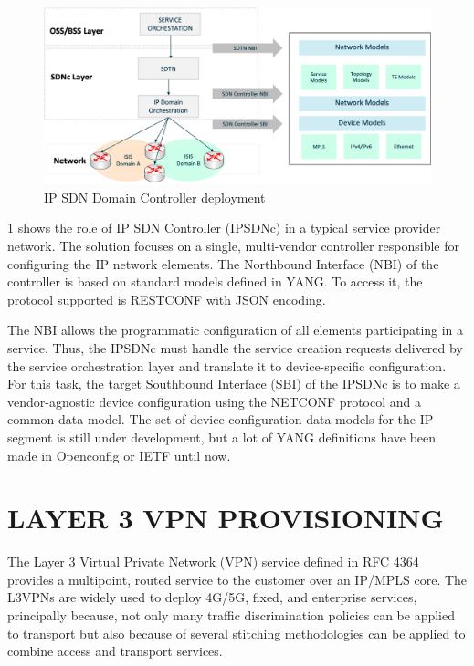 \documentclass[conference]{IEEEtran}
\begin{document}
\begin{figure}
	\centering
		\includegraphics[width=\linewidth]{ifusion_multidomain_2.png}
	\caption{IP SDN Domain Controller deployment}
	\label{FIG:1}
\end{figure}


\ref{FIG:1} shows the role of IP SDN Controller (IPSDNc) in a typical service provider network. The solution focuses on a single, multi-vendor controller responsible for configuring the IP network elements. The Northbound Interface (NBI) of the controller is based on standard models defined in YANG. To access it, the protocol supported is RESTCONF with JSON encoding.

The NBI allows the programmatic configuration of all elements participating in a service. Thus, the IPSDNc must handle the service creation requests delivered by the service orchestration layer and translate it to device-specific configuration. For this task, the target Southbound Interface (SBI) of the IPSDNc is to make a vendor-agnostic device configuration using the NETCONF protocol and a common data model. The set of device configuration data models for the IP segment is still under development, but a lot of YANG definitions have been made in Openconfig or IETF until now. 

\section{LAYER 3 VPN PROVISIONING}

The Layer 3 Virtual Private Network (VPN) service defined in RFC 4364 \cite{rosen2006rfc} provides a multipoint, routed service to the customer over an IP/MPLS core. The L3VPNs are widely used to deploy 4G/5G, fixed, and enterprise services, principally because, not only many traffic discrimination policies can be applied to transport but also because of several stitching methodologies can be applied to combine access and transport services. 
\end{document}
